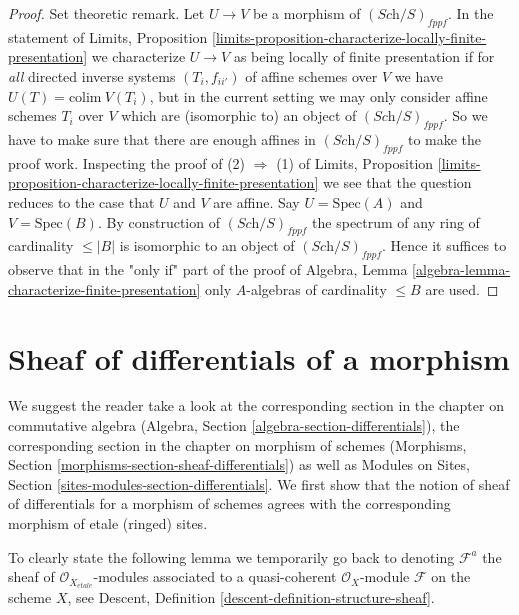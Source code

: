 \begin{proof}
\medskip\noindent
Set theoretic remark. Let $U \to V$ be a morphism of
$(\textit{Sch}/S)_{fppf}$. In the statement of
Limits, Proposition
\ref{limits-proposition-characterize-locally-finite-presentation}
we characterize $U \to V$ as being locally of finite presentation
if for {\it all} directed inverse systems $(T_i, f_{ii'})$ of affine schemes
over $V$ we have $U(T) = \text{colim}\ V(T_i)$, but in the current setting
we may only consider affine schemes $T_i$ over $V$ which are (isomorphic to)
an object of $(\textit{Sch}/S)_{fppf}$. So we have to make sure that there
are enough affines in $(\textit{Sch}/S)_{fppf}$ to make the proof work.
Inspecting the proof of (2) $\Rightarrow$ (1) of
Limits, Proposition
\ref{limits-proposition-characterize-locally-finite-presentation}
we see that the question reduces to the case that $U$ and $V$ are affine.
Say $U = \text{Spec}(A)$ and $V = \text{Spec}(B)$. By construction
of $(\textit{Sch}/S)_{fppf}$ the spectrum of any ring of cardinality
$\leq |B|$ is isomorphic to an object of $(\textit{Sch}/S)_{fppf}$.
Hence it suffices to observe that in the "only if" part of the proof of
Algebra, Lemma \ref{algebra-lemma-characterize-finite-presentation}
only $A$-algebras of cardinality $\leq B$ are used.
\end{proof}













\section{Sheaf of differentials of a morphism}
\label{section-sheaf-differentials}

\noindent
We suggest the reader take a look at the corresponding section
in the chapter on commutative algebra
(Algebra, Section \ref{algebra-section-differentials}),
the corresponding section in the chapter on morphism of schemes
(Morphisms, Section \ref{morphisms-section-sheaf-differentials})
as well as
Modules on Sites, Section \ref{sites-modules-section-differentials}.
We first show that the notion of sheaf of differentials for a
morphism of schemes agrees with the corresponding morphism of
etale (ringed) sites.

\medskip\noindent
To clearly state the following lemma we temporarily go back to
denoting $\mathcal{F}^a$ the sheaf of $\mathcal{O}_{X_{etale}}$-modules
associated to a quasi-coherent $\mathcal{O}_X$-module $\mathcal{F}$
on the scheme $X$, see
Descent, Definition \ref{descent-definition-structure-sheaf}.


